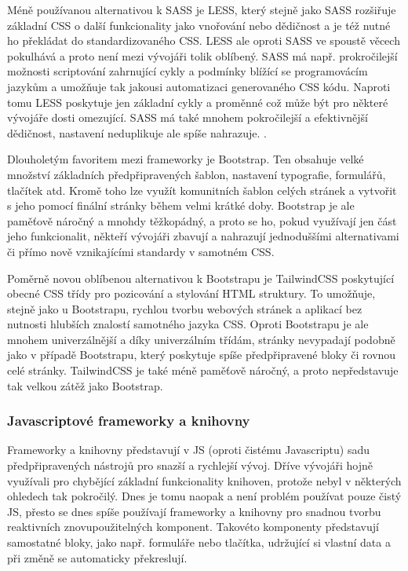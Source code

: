 		Méně používanou alternativou k \Ac{SASS} je \Ac{LESS}, který stejně jako \Ac{SASS} rozšiřuje základní \Ac{CSS}
		o další funkcionality jako vnořování nebo dědičnost a je též nutné ho překládat do standardizovaného \Ac{CSS}. \cite{less_overview}
		\Ac{LESS} ale oproti \Ac{SASS} ve spoustě věcech pokulhává a proto není mezi vývojáři tolik oblíbený.
		\Ac{SASS} má např. prokročilejší možnosti scriptování zahrnující cykly a podmínky blížící se programovácím jazykům
		a umožňuje tak jakousi automatizaci generovaného \Ac{CSS} kódu.
		Naproti tomu \Ac{LESS} poskytuje jen základní cykly a proměnné což může být pro některé vývojáře dosti omezující.
		\Ac{SASS} má také mnohem pokročilejší a efektivnější dědičnost, nastavení neduplikuje ale spíše nahrazuje. \cite{sass_vs_less}.

		Dlouholetým favoritem mezi frameworky je Bootstrap.
		Ten obsahuje velké množství základních předpřipravených šablon, nastavení typografie, formulářů, tlačítek atd.
		Kromě toho lze využít komunitních šablon celých stránek a vytvořit s jeho pomocí finální stránky během velmi krátké doby.
		Bootstrap je ale paměťově náročný a mnohdy těžkopádný, a proto se ho, pokud využívají jen část jeho funkcionalit,
		někteří vývojáři zbavují a nahrazují jednoduššími alternativami či přímo nově vznikajícími standardy
		v samotném \Ac{CSS}. \cite{bootstrap}

		Poměrně novou oblíbenou alternativou k Bootstrapu je TailwindCSS poskytující obecné \Ac{CSS} třídy pro
		pozicování a stylování \Ac{HTML} struktury.
		To umožňuje, stejně jako u Bootstrapu, rychlou tvorbu webových stránek a aplikací bez nutnosti hlubších znalostí
		samotného jazyka \Ac{CSS}. \cite{tailwindcss}
		Oproti Bootstrapu je ale mnohem univerzálnější a díky univerzálním třídám, stránky nevypadají podobně jako v případě
		Bootstrapu, který poskytuje spíše předpřipravené bloky či rovnou celé stránky.
		TailwindCSS je také méně paměťově náročný, a proto nepředstavuje tak velkou zátěž jako Bootstrap.
		\cite{tailwindcss_vs_bootstrap}

		\subsubsection{Javascriptové frameworky a knihovny}

		Frameworky a knihovny představují v \ac{JS} (oproti čistému Javascriptu) sadu předpřipravených nástrojů pro snazší a rychlejší vývoj.
		Dříve vývojáři hojně využívali pro chybějící základní funkcionality knihoven, protože nebyl v některých ohledech tak
		pokročilý.
		Dnes je tomu naopak a není problém používat pouze čistý \ac{JS}, přesto se dnes spíše
		používají frameworky a knihovny pro snadnou tvorbu reaktivních znovupoužitelných komponent.
		Takovéto komponenty představují samostatné bloky, jako např. formuláře nebo tlačítka, udržující si vlastní
		data a při změně se automaticky překreslují.

